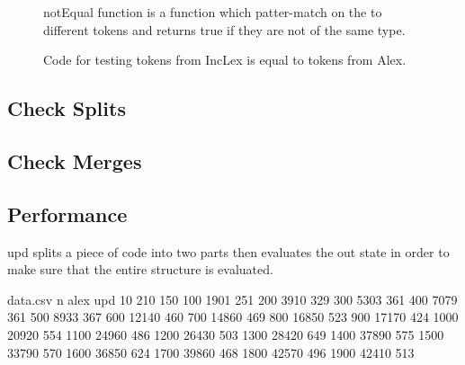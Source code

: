 \begin{figure}[h!]
  \centering
  
  notEqual function is a function which patter-match on the to different tokens and returns true if they are not of the same type.
  \caption{Code for testing tokens from IncLex is equal to tokens from Alex. 
  \label{fig:CheckEquility}}
\end{figure} 

\subsection{Check Splits}

\subsection{Check Merges} 

\subsection{Performance}
upd splits a piece of code into two parts then evaluates the out state in order to make sure that the entire structure is evaluated.

\begin{filecontents*}{data.csv}
n     alex   upd
10    210    150
100   1901   251
200   3910   329
300   5303   361
400   7079   361
500   8933   367
600   12140  460
700   14860  469
800   16850  523
900   17170  424
1000  20920  554
1100  24960  486
1200  26430  503
1300  28420  649
1400  37890  575
1500  33790  570
1600  36850  624
1700  39860  468
1800  42570  496
1900  42410  513
\end{filecontents*}
\\

